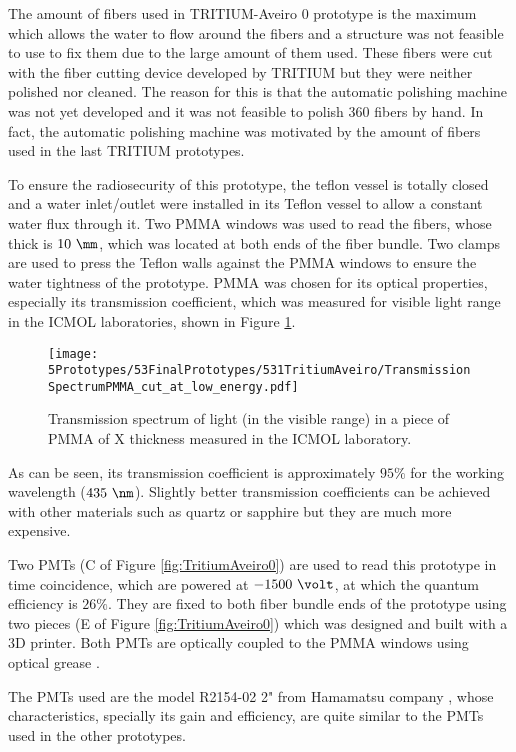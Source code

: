 The amount of fibers used in TRITIUM-Aveiro 0 prototype is the maximum which allows the water to flow around the fibers and a structure was not feasible to use to fix them due to the large amount of them used. These fibers were cut with the fiber cutting device developed by TRITIUM but they were neither polished nor cleaned. The reason for this is that the automatic polishing machine was not yet developed and it was not feasible to polish 360 fibers by hand. In fact, the automatic polishing machine was motivated by the amount of fibers used in the last TRITIUM prototypes.

To ensure the radiosecurity of this prototype, the teflon vessel is totally closed and  a water inlet/outlet were installed in its Teflon vessel to allow a constant water flux through it. Two PMMA windows was used to read the fibers, whose thick is $10~\mm$, which was located at both ends of the fiber bundle. Two clamps are used to press the Teflon walls against the PMMA windows to ensure the water tightness of the prototype. PMMA was chosen for its optical properties, especially its transmission coefficient, which was measured for visible light range in the ICMOL laboratories, shown in Figure \ref{fig:PMMATransmissionSpectrum}.

\begin{figure}[h]
\centering
\texttt{[image: 5Prototypes/53FinalPrototypes/531TritiumAveiro/TransmissionSpectrumPMMA\_cut\_at\_low\_energy.pdf]}
\caption{Transmission spectrum of light (in the visible range) in a piece of PMMA of X thickness measured in the ICMOL laboratory. \label{fig:PMMATransmissionSpectrum}}
\end{figure}	

As can be seen, its transmission coefficient is approximately $95\%$ for the working wavelength ($435~\nm$). Slightly better transmission coefficients can be achieved with other materials such as quartz or sapphire but they are much more expensive.

Two PMTs (C of Figure \ref{fig:TritiumAveiro0}) are used to read this prototype in time coincidence, which are powered at $-1500~\volt$, at which the quantum efficiency is $26\%$. They are fixed to both fiber bundle ends of the prototype using two pieces (E of Figure \ref{fig:TritiumAveiro0}) which was designed and built with a 3D printer. Both PMTs are optically coupled to the PMMA windows using optical grease \cite{OpticalGrease}.

The PMTs used are the model R2154-02 2" from Hamamatsu company \cite{DataSheetPMTsAveiro}, whose characteristics, specially its gain and efficiency, are quite similar to the PMTs used in the other prototypes.

